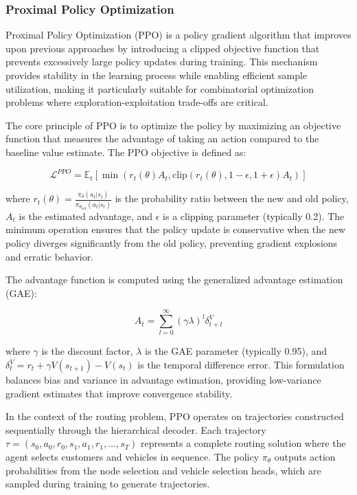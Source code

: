 \subsubsection{Proximal Policy Optimization}

Proximal Policy Optimization (PPO) is a policy gradient algorithm that improves upon previous approaches by introducing a clipped objective function that prevents excessively large policy updates during training. This mechanism provides stability in the learning process while enabling efficient sample utilization, making it particularly suitable for combinatorial optimization problems where exploration-exploitation trade-offs are critical.

The core principle of PPO is to optimize the policy by maximizing an objective function that measures the advantage of taking an action compared to the baseline value estimate. The PPO objective is defined as:

\begin{equation}
\mathcal{L}^{PPO} = \mathbb{E}_t \left[ \min(r_t(\theta) A_t, \text{clip}(r_t(\theta), 1-\epsilon, 1+\epsilon) A_t) \right]
\end{equation}

where $r_t(\theta) = \frac{\pi_\theta(a_t | s_t)}{\pi_{\theta_{old}}(a_t | s_t)}$ is the probability ratio between the new and old policy, $A_t$ is the estimated advantage, and $\epsilon$ is a clipping parameter (typically 0.2). The minimum operation ensures that the policy update is conservative when the new policy diverges significantly from the old policy, preventing gradient explosions and erratic behavior.

The advantage function is computed using the generalized advantage estimation (GAE):

\begin{equation}
A_t = \sum_{l=0}^{\infty} (\gamma \lambda)^l \delta_{t+l}^V
\end{equation}

where $\gamma$ is the discount factor, $\lambda$ is the GAE parameter (typically 0.95), and $\delta_t^V = r_t + \gamma V(s_{t+1}) - V(s_t)$ is the temporal difference error. This formulation balances bias and variance in advantage estimation, providing low-variance gradient estimates that improve convergence stability.

In the context of the routing problem, PPO operates on trajectories constructed sequentially through the hierarchical decoder. Each trajectory $\tau = (s_0, a_0, r_0, s_1, a_1, r_1, \ldots, s_T)$ represents a complete routing solution where the agent selects customers and vehicles in sequence. The policy $\pi_\theta$ outputs action probabilities from the node selection and vehicle selection heads, which are sampled during training to generate trajectories.

